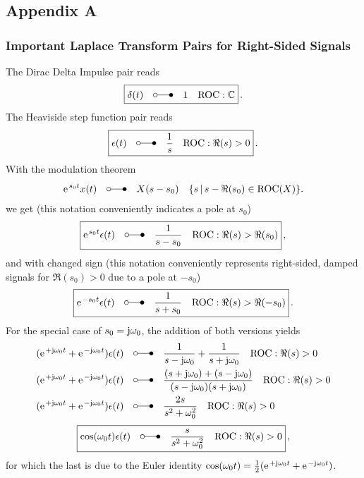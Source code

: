 \documentclass[11pt,a4paper,DIV=12]{scrartcl}
\begin{document}
\subsection*{Appendix A}

\subsubsection*{Important Laplace Transform Pairs for Right-Sided Signals}
The Dirac Delta Impulse pair reads
\begin{align}
\boxed{\delta(t) \quad \laplace \quad 1 \quad \text{ROC}: \mathbb{C}}\,.
\end{align}
The Heaviside step function pair reads
\begin{align}
\boxed{\epsilon(t) \quad \laplace \quad \frac{1}{s} \quad \text{ROC}: \Re(s)>0}\,.
\end{align}
With the modulation theorem
\begin{align}
\e^{s_0 t} x(t) \quad \laplace \quad X(s-s_0) \quad \{s \, | \, s-\Re(s_0) \in \text{ROC}(X)\}.
\end{align}
we get (this notation conveniently indicates a pole at $s_0$)
\begin{align}
\boxed{\e^{s_0 t} \epsilon(t)\quad \laplace \quad \frac{1}{s-s_0} \quad \text{ROC}: \Re(s)>\Re(s_0)}\,,
\end{align}
and with changed sign (this notation conveniently represents right-sided,
damped signals for $\Re(s_0)>0$ due to a pole at $-s_0$)
\begin{align}
\boxed{\e^{-s_0 t} \epsilon(t)\quad \laplace \quad \frac{1}{s+s_0} \quad \text{ROC}: \Re(s)>\Re(-s_0)}\,.
\end{align}
%
For the special case of $s_0 = \im \omega_0$, the addition of both versions
yields
\begin{align}
(\e^{+\im \omega_0 t} + \e^{-\im \omega_0 t})  \epsilon(t)\quad &\laplace \quad \frac{1}{s-\im \omega_0} + \frac{1}{s+\im \omega_0} \quad \text{ROC}: \Re(s)>0\\
(\e^{+\im \omega_0 t} + \e^{-\im \omega_0 t})  \epsilon(t)\quad &\laplace \quad \frac{(s+\im \omega_0) + (s-\im \omega_0)}{(s-\im \omega_0)(s+\im \omega_0)}\quad \text{ROC}: \Re(s)>0\\
(\e^{+\im \omega_0 t} + \e^{-\im \omega_0 t})  \epsilon(t)\quad &\laplace \quad \frac{2 s}{s^2 + \omega_0^2}\quad \text{ROC}: \Re(s)>0
\end{align}
\begin{align}
\boxed{\cos(\omega_0 t) \epsilon(t)\quad \laplace \quad \frac{s}{s^2 + \omega_0^2}\quad \text{ROC}: \Re(s)>0}\,,
\end{align}
for which the last is due to the Euler identity $\cos(\omega_0 t) = \frac{1}{2} (\e^{+\im \omega_0 t}+\e^{-\im \omega_0 t})$.
%
\end{document}
